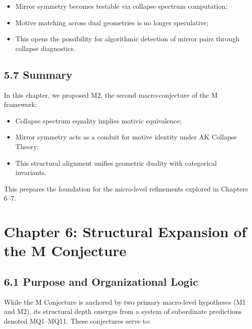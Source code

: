 \documentclass[11pt]{article}
\begin{document}
\begin{itemize}
    \item Mirror symmetry becomes testable via collapse spectrum computation;
    \item Motive matching across dual geometries is no longer speculative;
    \item This opens the possibility for algorithmic detection of mirror pairs through collapse diagnostics.
\end{itemize}

\subsection{5.7 Summary}

In this chapter, we proposed M2, the second macro-conjecture of the M framework:

\begin{itemize}
    \item Collapse spectrum equality implies motivic equivalence;
    \item Mirror symmetry acts as a conduit for motive identity under AK Collapse Theory;
    \item This structural alignment unifies geometric duality with categorical invariants.
\end{itemize}

This prepares the foundation for the micro-level refinements explored in Chapters 6–7.

\FloatBarrier




\section{Chapter 6: Structural Expansion of the M Conjecture}

\subsection{6.1 Purpose and Organizational Logic}

While the M Conjecture is anchored by two primary macro-level hypotheses (M1 and M2), its structural depth emerges from a system of subordinate predictions denoted MQ1–MQ11. These conjectures serve to:
\end{document}
